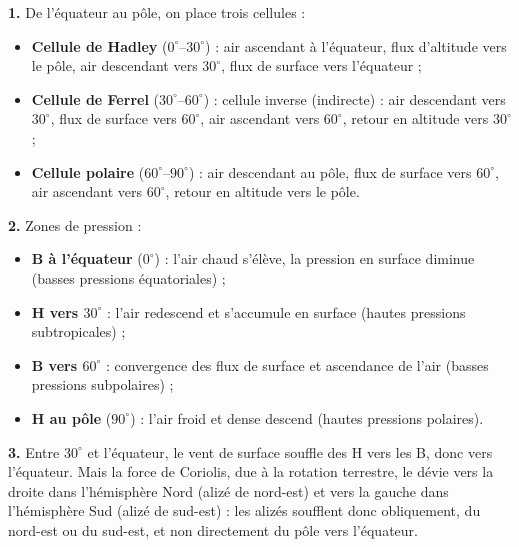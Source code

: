 \documentclass[11pt]{article}
\newcommand{\cle}[1]{{\popxbold\color{popdark}#1}}
\begin{document}
\begin{corrige}
\textbf{1.} De l'équateur au pôle, on place trois cellules :
\begin{itemize}
\item \textbf{Cellule de Hadley} ($0^\circ$--$30^\circ$) : air ascendant à l'équateur, flux d'altitude vers le pôle, air descendant vers $30^\circ$, flux de surface vers l'équateur ;
\item \textbf{Cellule de Ferrel} ($30^\circ$--$60^\circ$) : cellule inverse (indirecte) : air descendant vers $30^\circ$, flux de surface vers $60^\circ$, air ascendant vers $60^\circ$, retour en altitude vers $30^\circ$ ;
\item \textbf{Cellule polaire} ($60^\circ$--$90^\circ$) : air descendant au pôle, flux de surface vers $60^\circ$, air ascendant vers $60^\circ$, retour en altitude vers le pôle.
\end{itemize}

\textbf{2.} Zones de pression :
\begin{itemize}
\item \textbf{B à l'équateur} ($0^\circ$) : l'air chaud s'élève, la pression en surface diminue (basses pressions équatoriales) ;
\item \textbf{H vers $30^\circ$} : l'air redescend et s'accumule en surface (hautes pressions subtropicales) ;
\item \textbf{B vers $60^\circ$} : convergence des flux de surface et ascendance de l'air (basses pressions subpolaires) ;
\item \textbf{H au pôle} ($90^\circ$) : l'air froid et dense descend (hautes pressions polaires).
\end{itemize}

\textbf{3.} Entre $30^\circ$ et l'équateur, le vent de surface souffle des H vers les B, donc vers l'équateur. Mais la \cle{force de Coriolis}, due à la rotation terrestre, le dévie vers la droite dans l'hémisphère Nord (alizé de nord-est) et vers la gauche dans l'hémisphère Sud (alizé de sud-est) : les alizés soufflent donc obliquement, du nord-est ou du sud-est, et non directement du pôle vers l'équateur.
\end{corrige}
\end{document}
